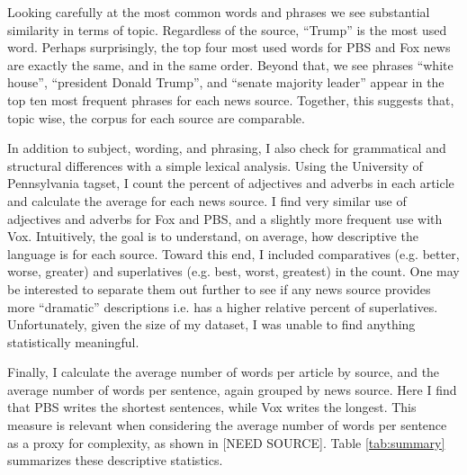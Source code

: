 \documentclass{article}
\begin{document}
	     
	    
	    Looking carefully at the most common words and phrases we see substantial similarity in terms of topic. Regardless of the source, ``Trump'' is the most used word. Perhaps surprisingly, the top four most used words for PBS and Fox news are exactly the same, and in the same order. Beyond that, we see phrases ``white house'', ``president Donald Trump'', and ``senate majority leader'' appear in the top ten most frequent phrases for each news source. Together, this suggests that, topic wise, the corpus for each source are comparable. 
	    
	    In addition to subject, wording, and phrasing, I also check for grammatical and structural differences with a simple lexical analysis. Using the University of Pennsylvania tagset, I count the percent of adjectives and adverbs in each article and calculate the average for each news source. I find very similar use of adjectives and adverbs for Fox and PBS, and a slightly more frequent use with Vox. Intuitively, the goal is to understand, on average, how descriptive the language is for each source. Toward this end, I included comparatives (e.g. better, worse, greater) and superlatives (e.g. best, worst, greatest) in the count. One may be interested to separate them out further to see if any news source provides more ``dramatic'' descriptions i.e. has a higher relative percent of superlatives. Unfortunately, given the size of my dataset, I was unable to find anything statistically meaningful. 
	    
	    Finally, I calculate the average number of words per article by source, and the average number of words per sentence, again grouped by news source. Here I find that PBS writes the shortest sentences, while Vox writes the longest. This measure is relevant when considering the average number of words per sentence as a proxy for complexity, as shown in [NEED SOURCE]. Table \ref{tab:summary} summarizes these descriptive statistics.  
 
    	
	    
\end{document}
